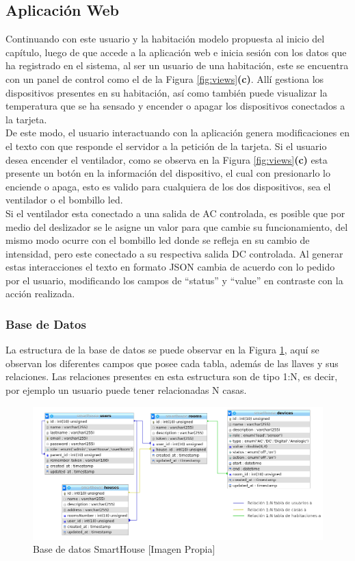 \subsection{Aplicación Web}

Continuando con este usuario y la habitación modelo propuesta al inicio del capítulo, luego de que accede a la aplicación web e inicia sesión con los datos que ha registrado en el sistema, al ser un usuario de una habitación, este se encuentra con un panel de control como el de la Figura \ref{fig:views}\textbf{(c)}. Allí gestiona los dispositivos presentes en su habitación, así como también puede visualizar la temperatura que se ha sensado y encender o apagar los dispositivos conectados a la tarjeta.\\

De este modo, el usuario interactuando con la aplicación genera modificaciones en el texto con que responde el servidor a la petición de la tarjeta. Si el usuario desea encender el ventilador, como se observa en la Figura \ref{fig:views}\textbf{(c)} esta presente un botón en la información del dispositivo, el cual con presionarlo lo enciende o apaga, esto es valido para cualquiera de los dos dispositivos, sea el ventilador o el bombillo led.\\

Si el ventilador esta conectado a una salida de AC controlada, es posible que por medio del deslizador se le asigne un valor para que cambie su funcionamiento, del mismo modo ocurre con el bombillo led donde se refleja en su cambio de intensidad, pero este conectado a su respectiva salida DC controlada. Al generar estas interacciones el texto en formato JSON cambia de acuerdo con lo pedido por el usuario, modificando los campos de ``status'' y ``value'' en contraste con la acción realizada.\\ 

\subsubsection{Base de Datos}

La estructura de la base de datos se puede observar en la Figura \ref{fig:db}, aquí se observan los diferentes campos que posee cada tabla, además de las llaves y sus relaciones. Las relaciones presentes en esta estructura son de tipo 1:N, es decir, por ejemplo un usuario puede tener relacionadas N casas.\\

\begin{figure}[H]
\centering
\caption{Base de datos SmartHouse [Imagen Propia]}
\label{fig:db}
\includegraphics[width=0.75\linewidth]{Imagenes/DB}
\end{figure}

